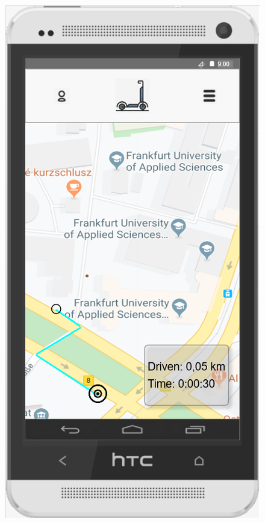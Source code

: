\documentclass[a4paper, 12pt]{article}
\begin{document}
\begin{figure} [htbp]
    \begin{center}
        \begin{minipage}{0.45\textwidth}
            \begin{center}
                \includegraphics[scale=0.65]{images/prototypes/01-02-start-menu---driving.png}

\end{center}
\end{minipage}
\end{center}
\end{figure}
\end{document}
